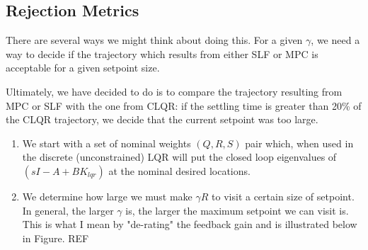 \documentclass[journal,twocolumn,twoside]{IEEEtran}
\begin{document}

\subsection{Rejection Metrics}\label{sec:metrics}
There are several ways we might think about doing this. 
For a given $\gamma$, we need a way to decide if the trajectory which results from either SLF or MPC is acceptable for a given setpoint size.

Ultimately, we have decided to do is to compare the trajectory resulting from MPC or SLF with the one from CLQR: if the settling time is greater than 20\% of the CLQR trajectory, we decide that the current setpoint was too large.


\begin{enumerate}
\item We start with a set of nominal weights \((Q,R, S)\) pair which, when used in the discrete (unconstrained) LQR will put the closed loop eigenvalues of $(sI - A + BK_{lqr})$ at the nominal desired locations. 
\item We determine how large we must make \(\gamma R\) to visit a certain size of setpoint. In general, the larger \(\gamma\) is, the larger the maximum setpoint we can visit is. This is what I mean by "de-rating" the feedback gain and is illustrated below in Figure. REF
\end{enumerate}
\end{document}
